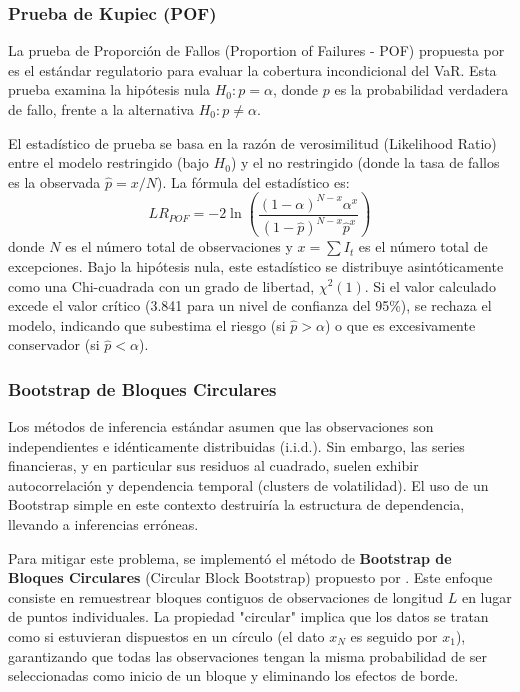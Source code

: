 \documentclass[
]{ceurart}
\begin{document}
\subsubsection{Prueba de Kupiec (POF)}
La prueba de Proporción de Fallos (Proportion of Failures - POF) propuesta por \cite{kupiec1995techniques} es el estándar regulatorio para evaluar la cobertura incondicional del VaR. Esta prueba examina la hipótesis nula $H_0: p = \alpha$, donde $p$ es la probabilidad verdadera de fallo, frente a la alternativa $H_0: p \neq \alpha$.

El estadístico de prueba se basa en la razón de verosimilitud (Likelihood Ratio) entre el modelo restringido (bajo $H_0$) y el no restringido (donde la tasa de fallos es la observada $\hat{p} = x/N$). La fórmula del estadístico es:
\begin{equation}
LR_{POF} = -2 \ln\left( \frac{(1-\alpha)^{N-x} \alpha^x}{(1-\hat{p})^{N-x} \hat{p}^x} \right)
\end{equation}
donde $N$ es el número total de observaciones y $x = \sum I_t$ es el número total de excepciones. Bajo la hipótesis nula, este estadístico se distribuye asintóticamente como una Chi-cuadrada con un grado de libertad, $\chi^2(1)$. Si el valor calculado excede el valor crítico (3.841 para un nivel de confianza del 95\%), se rechaza el modelo, indicando que subestima el riesgo (si $\hat{p} > \alpha$) o que es excesivamente conservador (si $\hat{p} < \alpha$).

\subsubsection{Bootstrap de Bloques Circulares}
Los métodos de inferencia estándar asumen que las observaciones son independientes e idénticamente distribuidas (i.i.d.). Sin embargo, las series financieras, y en particular sus residuos al cuadrado, suelen exhibir autocorrelación y dependencia temporal (clusters de volatilidad). El uso de un Bootstrap simple en este contexto destruiría la estructura de dependencia, llevando a inferencias erróneas.

Para mitigar este problema, se implementó el método de \textbf{Bootstrap de Bloques Circulares} (Circular Block Bootstrap) propuesto por \cite{politis1992}. Este enfoque consiste en remuestrear bloques contiguos de observaciones de longitud $L$ en lugar de puntos individuales. La propiedad "circular" implica que los datos se tratan como si estuvieran dispuestos en un círculo (el dato $x_N$ es seguido por $x_1$), garantizando que todas las observaciones tengan la misma probabilidad de ser seleccionadas como inicio de un bloque y eliminando los efectos de borde.
\end{document}

